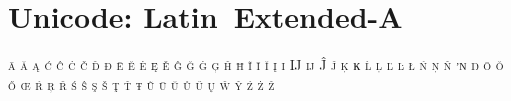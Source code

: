 

\presection\section*{\checkno Unicode: Latin~Extended-A}\postsection


\textsc{ā ă ą ć ĉ ċ č ď đ ē ĕ ė ę ě ĝ ğ ġ ģ ĥ ħ ĩ ī ĭ į ı Ĳ ĳ Ĵ ĵ ķ 
ĸ ĺ ļ ľ ŀ ł ń ņ ň ŉ ŋ ō ŏ ő œ ŕ ŗ ř ś ŝ ş š ţ ť ŧ ũ ū ŭ ů ű ų 
ŵ ŷ ź ż ž}